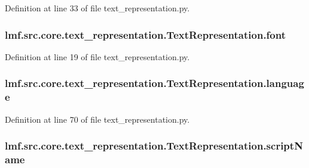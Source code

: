 Definition at line 33 of file text\+\_\+representation.\+py.

\hypertarget{classlmf_1_1src_1_1core_1_1text__representation_1_1_text_representation_a78df11b119c24be8b18e6f121e0bb802}{
\subsubsection[{font}]{\setlength{\rightskip}{0pt plus 5cm}lmf.\+src.\+core.\+text\+\_\+representation.\+Text\+Representation.\+font}}\label{classlmf_1_1src_1_1core_1_1text__representation_1_1_text_representation_a78df11b119c24be8b18e6f121e0bb802}


Definition at line 19 of file text\+\_\+representation.\+py.

\hypertarget{classlmf_1_1src_1_1core_1_1text__representation_1_1_text_representation_aba23f79743bc4aa642f344aec09a3807}{
\subsubsection[{language}]{\setlength{\rightskip}{0pt plus 5cm}lmf.\+src.\+core.\+text\+\_\+representation.\+Text\+Representation.\+language}}\label{classlmf_1_1src_1_1core_1_1text__representation_1_1_text_representation_aba23f79743bc4aa642f344aec09a3807}


Definition at line 70 of file text\+\_\+representation.\+py.

\hypertarget{classlmf_1_1src_1_1core_1_1text__representation_1_1_text_representation_a1aeda3c7310f02affa313c8797bfaf65}{
\subsubsection[{script\+Name}]{\setlength{\rightskip}{0pt plus 5cm}lmf.\+src.\+core.\+text\+\_\+representation.\+Text\+Representation.\+script\+Name}}\label{classlmf_1_1src_1_1core_1_1text__representation_1_1_text_representation_a1aeda3c7310f02affa313c8797bfaf65}


